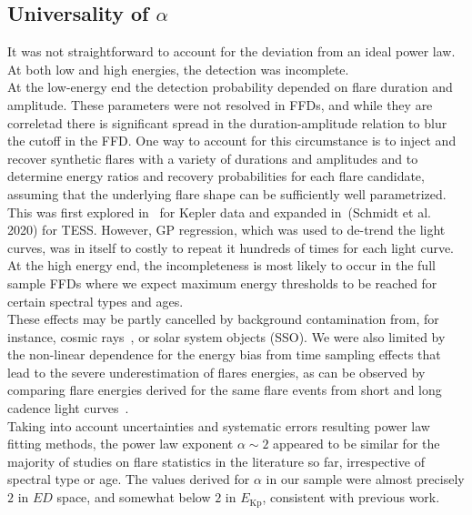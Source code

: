 \documentclass{aa}
\begin{document}
\subsection{Universality of $\alpha$}
It was not straightforward to account for the deviation from an ideal power law. At both low and high energies, the detection was incomplete.
\\
At the low-energy end the detection probability depended on flare duration and amplitude. These parameters were not resolved in FFDs, and while they are correletad there is significant spread in the duration-amplitude relation to blur the cutoff in the FFD. One way to account for this circumstance is to inject and recover synthetic flares with a variety of durations and amplitudes and to determine energy ratios and recovery probabilities for each flare candidate, assuming that the underlying flare shape can be sufficiently well parametrized. This was first explored in~\citet{davenport_kepler_2014} for Kepler data and expanded in~(Schmidt et al. 2020) for TESS. However, GP regression, which was used to de-trend the light curves, was in itself to costly to repeat it hundreds of times for each light curve. 
\\
At the high energy end, the incompleteness is most likely to occur in the full sample FFDs where we expect maximum energy thresholds to be reached for certain spectral types and ages. 
\\
These effects may be partly cancelled by background contamination from, for instance, cosmic rays~\citep{aschwanden_powerlaws_2015}, or solar system objects (SSO). We were also limited by the non-linear dependence for the energy bias from time sampling effects that lead to the severe underestimation of flares energies, as can be observed by comparing flare energies derived for the same flare events from short and long cadence light curves~\citep{yang_flaresampling_2018}.  
\\
Taking into account uncertainties and systematic errors resulting power law fitting methods, the power law exponent $\alpha\sim 2$ appeared to be similar for the majority of studies on flare statistics in the literature so far, irrespective of spectral type or age. The values derived for $\alpha$ in our sample were almost precisely $2$ in $ED$ space, and somewhat below $2$ in $E_\mathrm{Kp}$, consistent with previous work.
\end{document}
